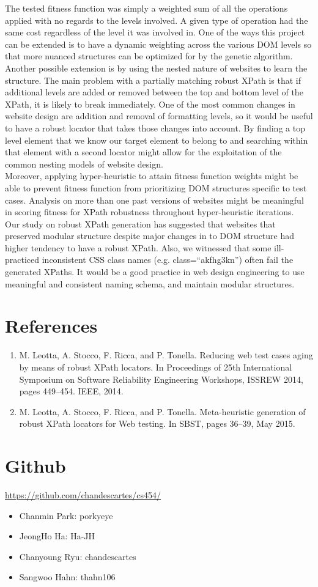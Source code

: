 \documentclass[format=acmlarge, nonacm=true]{acmart}
\begin{document}
The tested fitness function was simply a weighted sum of all the operations applied with no regards to the levels involved. A given type of operation had the same cost regardless of the level it was involved in. One of the ways this project can be extended is to have a dynamic weighting across the various DOM levels so that more nuanced structures can be optimized for by the genetic algorithm.\\

Another possible extension is by using the nested nature of websites to learn the structure. The main problem with a partially matching robust XPath is that if additional levels are added or removed between the top and bottom level of the XPath, it is likely to break immediately. One of the most common changes in website design are addition and removal of formatting levels, so it would be useful to have a robust locator that takes those changes into account. By finding a top level element that we know our target element to belong to and searching within that element with a second locator might allow for the exploitation of the common nesting models of website design.\\

Moreover, applying hyper-heuristic to attain fitness function weights might be able to prevent fitness function from prioritizing DOM structures specific to test cases. Analysis on more than one past versions of websites might be meaningful in scoring fitness for XPath robustness throughout hyper-heuristic iterations. \\
Our study on robust XPath generation has suggested that websites that preserved modular structure despite major changes in to DOM structure had higher tendency to have a robust XPath. Also, we witnessed that some ill-practiced inconsistent CSS class names (e.g. class=“akfhg3kn”) often fail the generated XPaths. It would be a good practice in web design engineering to use meaningful and consistent naming schema, and maintain modular structures. \\




\section*{References}
\begin{enumerate}
	\item M. Leotta, A. Stocco, F. Ricca, and P. Tonella. Reducing web test cases aging by means of robust XPath locators. In Proceedings of 25th International Symposium on Software Reliability Engineering Workshops, ISSREW 2014, pages 449–454. IEEE, 2014.
	\item M. Leotta, A. Stocco, F. Ricca, and P. Tonella. Meta-heuristic generation of robust XPath locators for Web testing. In SBST, pages 36–39, May 2015.
\end{enumerate}

\newpage
\section*{Github}
\url{https://github.com/chandescartes/cs454/}
\begin{itemize}
	\item Chanmin Park: porkyeye
	\item JeongHo Ha: Ha-JH
	\item Chanyoung Ryu: chandescartes
	\item Sangwoo Hahn: thahn106
\end{itemize}
\end{document}
